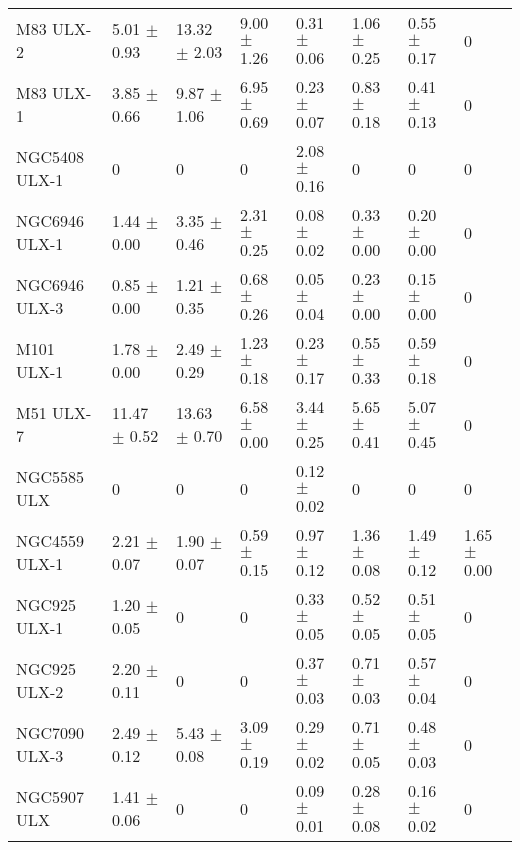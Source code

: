 \begin{tabular}{llllllll}
         M83 ULX-2 &   5.01 $\pm$ 0.93 &  13.32 $\pm$ 2.03 &   9.00 $\pm$ 1.26 &  0.31 $\pm$ 0.06 &   1.06 $\pm$ 0.25 &  0.55 $\pm$ 0.17 &                 0 \\
         M83 ULX-1 &   3.85 $\pm$ 0.66 &   9.87 $\pm$ 1.06 &   6.95 $\pm$ 0.69 &  0.23 $\pm$ 0.07 &   0.83 $\pm$ 0.18 &  0.41 $\pm$ 0.13 &                 0 \\
     NGC5408 ULX-1 &                 0 &                 0 &                 0 &  2.08 $\pm$ 0.16 &                 0 &                0 &                 0 \\
     NGC6946 ULX-1 &   1.44 $\pm$ 0.00 &   3.35 $\pm$ 0.46 &   2.31 $\pm$ 0.25 &  0.08 $\pm$ 0.02 &   0.33 $\pm$ 0.00 &  0.20 $\pm$ 0.00 &                 0 \\
     NGC6946 ULX-3 &   0.85 $\pm$ 0.00 &   1.21 $\pm$ 0.35 &   0.68 $\pm$ 0.26 &  0.05 $\pm$ 0.04 &   0.23 $\pm$ 0.00 &  0.15 $\pm$ 0.00 &                 0 \\
        M101 ULX-1 &   1.78 $\pm$ 0.00 &   2.49 $\pm$ 0.29 &   1.23 $\pm$ 0.18 &  0.23 $\pm$ 0.17 &   0.55 $\pm$ 0.33 &  0.59 $\pm$ 0.18 &                 0 \\
         M51 ULX-7 &  11.47 $\pm$ 0.52 &  13.63 $\pm$ 0.70 &   6.58 $\pm$ 0.00 &  3.44 $\pm$ 0.25 &   5.65 $\pm$ 0.41 &  5.07 $\pm$ 0.45 &                 0 \\
       NGC5585 ULX &                 0 &                 0 &                 0 &  0.12 $\pm$ 0.02 &                 0 &                0 &                 0 \\
     NGC4559 ULX-1 &   2.21 $\pm$ 0.07 &   1.90 $\pm$ 0.07 &   0.59 $\pm$ 0.15 &  0.97 $\pm$ 0.12 &   1.36 $\pm$ 0.08 &  1.49 $\pm$ 0.12 &   1.65 $\pm$ 0.00 \\
      NGC925 ULX-1 &   1.20 $\pm$ 0.05 &                 0 &                 0 &  0.33 $\pm$ 0.05 &   0.52 $\pm$ 0.05 &  0.51 $\pm$ 0.05 &                 0 \\
      NGC925 ULX-2 &   2.20 $\pm$ 0.11 &                 0 &                 0 &  0.37 $\pm$ 0.03 &   0.71 $\pm$ 0.03 &  0.57 $\pm$ 0.04 &                 0 \\
     NGC7090 ULX-3 &   2.49 $\pm$ 0.12 &   5.43 $\pm$ 0.08 &   3.09 $\pm$ 0.19 &  0.29 $\pm$ 0.02 &   0.71 $\pm$ 0.05 &  0.48 $\pm$ 0.03 &                 0 \\
       NGC5907 ULX &   1.41 $\pm$ 0.06 &                 0 &                 0 &  0.09 $\pm$ 0.01 &   0.28 $\pm$ 0.08 &  0.16 $\pm$ 0.02 &                 0 \\

\end{tabular}
